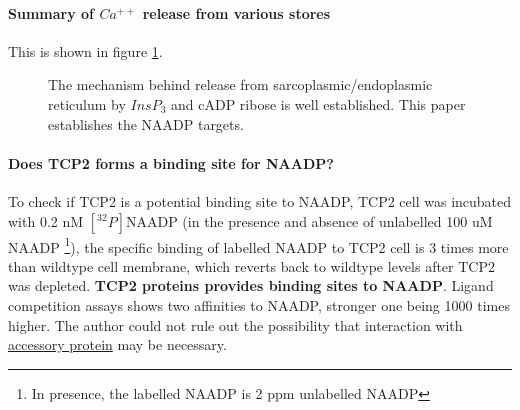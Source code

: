 \documentclass[twocolumn]{article}
\date{\today}
\begin{document}
\paragraph{Summary of $Ca^{++}$ release from various stores}  This is shown in figure \ref{fig:ca_release}.

\begin{figure}[h]
    \centering
    \caption{ The mechanism behind release from sarcoplasmic/endoplasmic
        reticulum by $InsP_3$ and cADP ribose is well established. This paper
        establishes the NAADP targets. }
    \label{fig:ca_release}
\end{figure}

\paragraph{Does TCP2 forms a binding site for NAADP?}

To check if TCP2 is a potential binding site to NAADP,  TCP2 cell was incubated
with 0.2 nM $[{}^{32}P]$NAADP (in the presence and absence of unlabelled 100 uM
NAADP \footnote{In presence, the labelled NAADP is 2 ppm unlabelled NAADP}), the
specific binding of labelled NAADP to TCP2 cell is 3 times more than wildtype
cell membrane, which reverts back to wildtype levels after TCP2 was depleted.
{\bf TCP2 proteins provides binding sites to NAADP}. Ligand competition assays
shows two affinities to NAADP, stronger one being 1000 times higher. The author
could not rule out the possibility that interaction with
\href{http://beginw.ncbi.nlm.nih.gov/pubmed/16402902}{accessory protein} may be
necessary.
\end{document}

